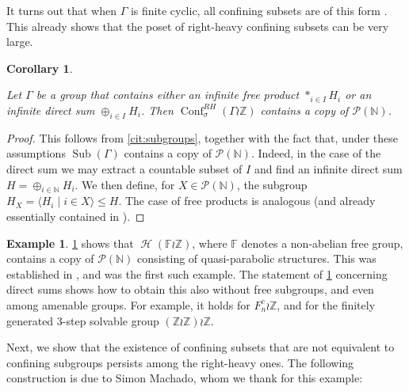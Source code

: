 \documentclass[reqno,12pt]{amsart}\setcounter{tocdepth}{1}
\newtheorem{corollary}[theorem]{Corollary}
\theoremstyle{definition}
\newtheorem{example}[theorem]{Example}
\newcommand{\N}{\mathbb{N}}
\newcommand{\Z}{\mathbb{Z}}
\DeclareMathOperator{\Sub}{Sub}
\DeclareMathOperator{\Hyp}{\mathcal{H}}
\DeclareMathOperator{\Conf}{Conf}
\numberwithin{equation}{section}
\begin{document}
It turns out that when $\Gamma$ is finite cyclic, all confining subsets are of this form \cite{sahana:wreath}. This already shows that the poset of right-heavy confining subsets can be very large.

\begin{corollary}
\label{cor:P(N):subgroups}

Let $\Gamma$ be a group that contains either an infinite free product $\ast_{i \in I} H_i$ or an infinite direct sum $\oplus_{i \in I} H_i$. Then $\Conf_\sigma^{RH}(\Gamma \wr \Z)$ contains a copy of $\mathcal{P}(\N)$.
\end{corollary}

\begin{proof}
This follows from \cref{cit:subgroups}, together with the fact that, under these assumptions $\Sub(\Gamma)$ contains a copy of $\mathcal{P}(\N)$. Indeed, in the case of the direct sum we may extract a countable subset of $I$ and find an infinite direct sum $H = \oplus_{i \in \N} H_i$. We then define, for $X \in \mathcal{P}(\N)$, the subgroup $H_X = \langle H_i \mid i \in X \rangle \leq H$. The case of free products is analogous (and already essentially contained in \cite{sahana:wreath}).
\end{proof}

\begin{example}
\label{ex:P(N):subgroups}
\cref{cor:P(N):subgroups} shows that $\Hyp(\mathbb{F} \wr \Z)$, where $\mathbb{F}$ denotes a non-abelian free group, contains a copy of $\mathcal{P}(\N)$ consisting of quasi-parabolic structures. This was established in \cite{sahana:wreath}, and was the first such example. The statement of \cref{cor:P(N):subgroups} concerning direct sums shows how to obtain this also without free subgroups, and even among amenable groups. For example, it holds for $F_n^c \wr \Z$, and for the finitely generated $3$-step solvable group $(\Z \wr \Z) \wr \Z$.
\end{example}

Next, we show that the existence of confining subsets that are not equivalent to confining subgroups persists among the right-heavy ones. The following construction is due to Simon Machado, whom we thank for this example:
\end{document}
